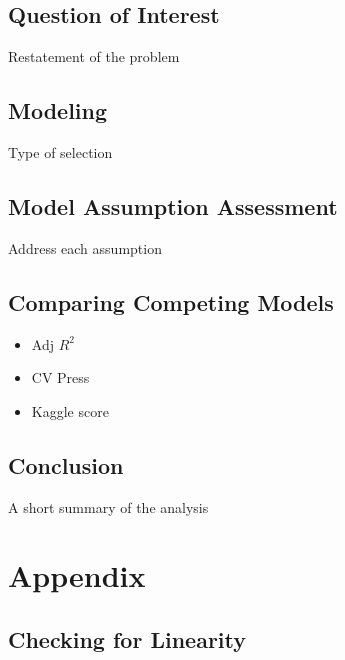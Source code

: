 \documentclass[american,]{article}
\providecommand{\tightlist}{%
  \setlength{\itemsep}{0pt}\setlength{\parskip}{0pt}}
\begin{document}
\hypertarget{question-of-interest-1}{%
\subsection{Question of Interest}\label{question-of-interest-1}}

Restatement of the problem

\hypertarget{modeling-1}{%
\subsection{Modeling}\label{modeling-1}}

Type of selection

\hypertarget{model-assumption-assessment}{%
\subsection{Model Assumption
Assessment}\label{model-assumption-assessment}}

Address each assumption

\hypertarget{comparing-competing-models-1}{%
\subsection{Comparing Competing
Models}\label{comparing-competing-models-1}}

\begin{itemize}
\tightlist
\item
  Adj \(R^2\)
\item
  CV Press
\item
  Kaggle score
\end{itemize}

\hypertarget{conclusion-1}{%
\subsection{Conclusion}\label{conclusion-1}}

A short summary of the analysis

\hypertarget{appendix}{%
\section{Appendix}\label{appendix}}

\hypertarget{checking-for-linearity}{%
\subsection{Checking for Linearity}\label{checking-for-linearity}}
\end{document}
